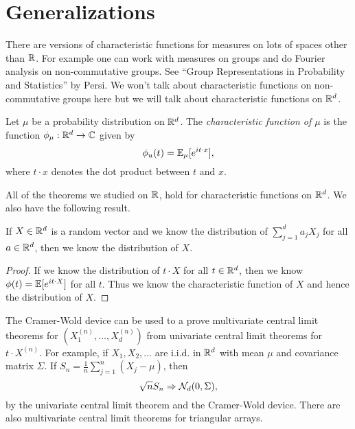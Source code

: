 \section{Generalizations}
There are versions of characteristic functions for measures on lots of spaces other than ${\mathbb R}$. For example one can work with measures on groups and do Fourier analysis on non-commutative groups. See ``Group Representations in Probability and Statistics'' by Persi. We won't talk about characteristic functions on non-commutative groups here but we will talk about characteristic functions on ${\mathbb R}^d$.
\begin{defn}
    Let $\mu$ be a probability distribution on ${\mathbb R}^d$. The \emph{characteristic function of $\mu$} is the function $\phi_\mu : {\mathbb R}^d \to {\mathbb C}$ given by 
    \[\phi_u(t) = {\mathbb{E}}_\mu[e^{it\cdot x}], \]
    where $t\cdot x$ denotes the dot product between $t$ and $x$.
\end{defn}
All of the theorems we studied on ${\mathbb R}$, hold for characteristic functions on ${\mathbb R}^d$. We also have the following result.
\begin{prop}
    If $X \in {\mathbb R}^d$ is a random vector and we know the distribution of $\sum_{j=1}^d a_j X_j$ for all $a \in {\mathbb R}^d$,  then we know the distribution of $X$.
\end{prop}
\begin{proof}
    If we know the distribution of $t \cdot X$ for all $t \in {\mathbb R}^d$, then we know $\phi(t) = {\mathbb{E}}[e^{it\cdot  X}]$ for all $t$. Thus we know the characteristic function of $X$ and hence the distribution of $X$.
\end{proof}
\begin{ex}
    The Cramer-Wold device can be used to a prove multivariate central limit theorems for $(X_1^{(n)},\ldots,X_d^{(n)})$ from univariate central limit theorems for $t\cdot X^{(n)}$. For example, if $X_1,X_2,\ldots$ are i.i.d. in ${\mathbb R}^d$ with mean $\mu$ and covariance matrix $\Sigma$. If $S_n = \frac{1}{n}\sum_{j=1}^n(X_j-\mu)$, then 
    \[\sqrt{n}S_n \Rightarrow {{\mathcal{N}}}_d(0,\Sigma), \]
    by the univariate central limit theorem and the Cramer-Wold device. There are also multivariate central limit theorems for triangular arrays.
\end{ex}
